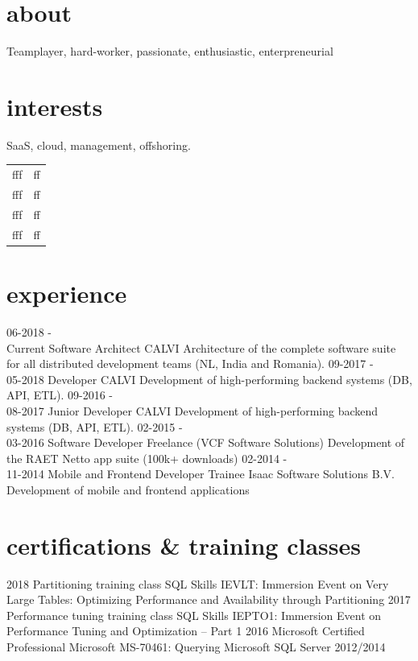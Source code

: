 \documentclass[]{friggeri-cv}
\begin{document}
\section{about}
Teamplayer, hard-worker, passionate, enthusiastic, enterpreneurial

\section{interests}
SaaS, cloud, management, offshoring.

\begin{table}[]
  \begin{tabular}{ll}
   fff & ff \\
   fff & ff \\
   fff & ff \\
   fff & ff \\
  \end{tabular}
\end{table}

\section{experience}

\begin{entrylist}
  \entry
    {06-2018 -\\Current}
    {Software Architect}
    {CALVI}
    {Architecture of the complete software suite for all distributed development teams (NL, India and Romania).}
  \entry
    {09-2017 -\\05-2018}
    {Developer}
    {CALVI}
    {Development of high-performing backend systems (DB, API, ETL).}
  \entry
    {09-2016 -\\08-2017}
    {Junior Developer}
    {CALVI}
    {Development of high-performing backend systems (DB, API, ETL).}
  \entry
    {02-2015 -\\03-2016}
    {Software Developer}
    {Freelance (VCF Software Solutions)}
    {Development of the RAET Netto app suite (100k+ downloads)}
  \entry
    {02-2014 -\\11-2014}
    {Mobile and Frontend Developer Trainee}
    {Isaac Software Solutions B.V.}
    {Development of mobile and frontend applications}
\end{entrylist}

\section{certifications \& training classes}
\begin{entrylist}
  \entry
    {2018}
    {Partitioning training class}
    {SQL Skills}
    {IEVLT: Immersion Event on Very Large Tables: Optimizing Performance and Availability through Partitioning}
  \entry
    {2017}
    {Performance tuning training class}
    {SQL Skills}
    {IEPTO1: Immersion Event on Performance Tuning and Optimization – Part 1}
  \entry
    {2016}
    {Microsoft Certified Professional}
    {Microsoft}
    {MS-70461:  Querying Microsoft SQL Server 2012/2014}
\end{entrylist}
\end{document}
